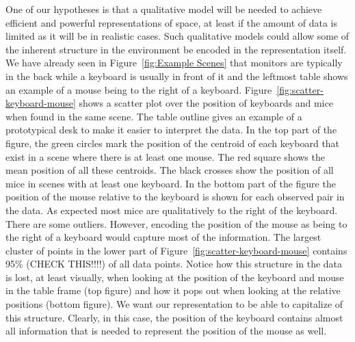 \documentclass[letterpaper, 10 pt, conference]{ieeeconf}  %
\begin{document}
One of our hypotheses is that a qualitative model will be needed to achieve efficient and powerful representations of 
space, at least if the amount of data is limited as it will be in realistic cases. Such qualitative models could allow some of the inherent 
structure in the environment be encoded in the representation itself. We have already seen in Figure~\ref{fig:Example Scenes} that monitors 
are typically in the back while a keyboard is usually in front of it and the leftmost table shows an example of a mouse being to the right of a keyboard. Figure~\ref{fig:scatter-keyboard-mouse} shows a scatter plot 
over the position of keyboards and mice when found in the same scene. The table outline gives an example of a prototypical desk to make it easier to interpret the data. 
In the top part of the figure, the green circles mark the position of the centroid of each 
keyboard that exist in a scene where there is at least one mouse. The red square shows the mean position of all these centroids. The black 
crosses show the position of all mice in scenes with at least one keyboard. In the bottom part of the figure the position of the mouse 
relative to the keyboard is shown for each observed pair in the data. As expected most mice are qualitatively to the right of the keyboard. There are some outliers. However,  
encoding the position of the mouse as being to the right of a keyboard would capture most of the information. The largest cluster of points in the lower part of Figure~\ref{fig:scatter-keyboard-mouse} contains 95\% (CHECK THIS!!!!) of all data points. Notice how this structure in the data is lost, at least visually, when looking at the position of the keyboard and mouse in the table frame (top figure) and how it pops out when looking at the relative positions (bottom figure). We want our representation to be able to capitalize of this structure. Clearly, in this case, the position of the keyboard contains almost all information that is needed to represent the position of the mouse as well.
\end{document}
